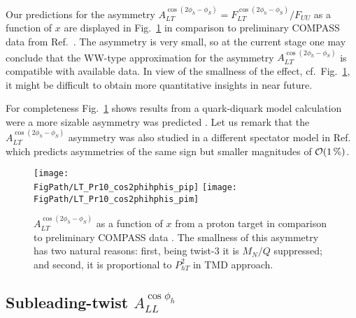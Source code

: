 \documentclass[a4paper,11pt]{article}
\newcommand{\blue}[1]{{\color{blue} #1}}
\newcommand{\ps}[1]{\blue{#1}}
\newcommand*{\FigPath}{./figs}%
\begin{document}
Our predictions for the asymmetry
$A_{LT}^{\cos(2\phi_h -\phi_S)}=F_{LT}^{\cos(2\phi_h -\phi_S)}/F_{UU}$ as a function
of $x$ are displayed in  Fig.~\ref{altcos2phihphis} in
comparison to preliminary COMPASS data from Ref.~\cite{Parsamyan:2013fia}.
The asymmetry is very small, so at the current stage one may
conclude that the WW-type approximation for the asymmetry
$A_{LT}^{\cos(2\phi_h -\phi_S)}$ is compatible with available data. In view
of the smallness of the effect, cf.\  Fig.~\ref{altcos2phihphis},
it might be difficult to obtain more quantitative insights
in near future.

\ps{For completeness Fig.~\ref{altcos2phihphis} shows results from a
quark-diquark model calculation were a more sizable asymmetry was predicted
\cite{Kotzinian:2008fe}. Let us remark that the $A_{LT}^{\cos(2\phi_h -\phi_S)}$
asymmetry was also studied in a different spectator model in
Ref.~\cite{Mao:2014fma} which predicts asymmetries of the same
sign but smaller magnitudes of ${\cal O}(1\,\%)$.}


\begin{figure}[h]
\centering
\texttt{[image: \\FigPath/LT\_Pr10\_cos2phihphis\_pip]}
\texttt{[image: \\FigPath/LT\_Pr10\_cos2phihphis\_pim]}
\caption{\label{altcos2phihphis} $A_{LT}^{\cos(2\phi_h - \phi_S)}$
	as a function of $ x $ from a proton target in comparison to
	preliminary COMPASS data \cite{Parsamyan:2013fia}. The smallness
	of this asymmetry has two natural reasons: first, being twist-3
	it is $M_N/Q$ suppressed; and second, it is proportional to
	$P_{hT}^2$  in TMD approach.}
\end{figure}


\newpage






\subsection{\boldmath   Subleading-twist  $A_{LL}^{\cos\phi_h}$}
\label{Sec-7.3:FLLcosphi}
\end{document}
